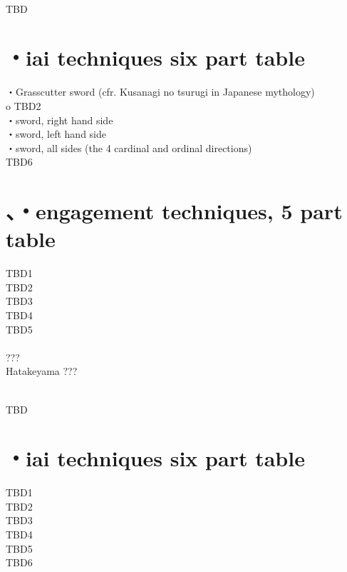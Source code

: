 \documentclass[dvipdfmx, a4paper, 12pt]{utarticle}
\begin{document}
\begin{CJK*}{UTF8}{min}
\begin{landscape}
\setcounter{section}{0}
\newpage
\pagestyle{empty}
\\
TBD
\section{・iai techniques six part table}
\noindent {}・Grasscutter sword (cfr. Kusanagi no tsurugi in Japanese mythology)\\
o
TBD2\\
・sword, right hand side\\
・sword, left hand side\\
・sword, all sides (the 4 cardinal and ordinal directions)\\
TBD6\\
\section{、・engagement techniques, 5 part table}
\noindent TBD1\\
TBD2\\
TBD3\\
TBD4\\
TBD5\\
\\
???\\
Hatakeyama ???

\setcounter{section}{0}
\newpage
\pagestyle{empty}
\\
TBD
\section{・iai techniques six part table}
\noindent TBD1\\
TBD2\\
TBD3\\
TBD4\\
TBD5\\
TBD6\\

\end{landscape}
\end{CJK*}
\end{document}
